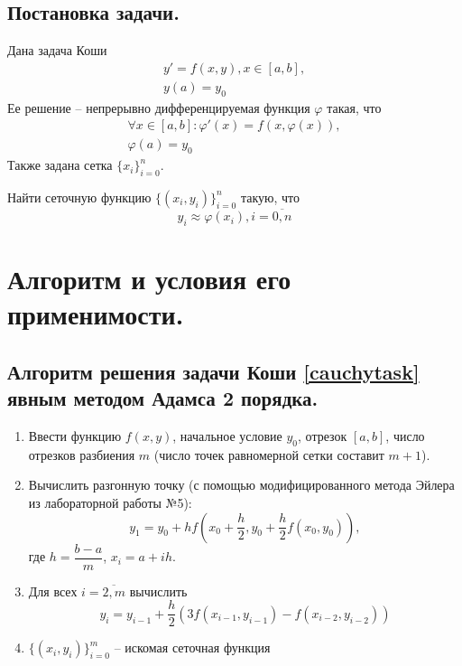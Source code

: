 \documentclass[a4paper, 12pt]{article}
\begin{document}
	\subsection{Постановка задачи.}
	
	Дана задача Коши
	\begin{equation} \label{cauchytask}
		\begin{gathered}
			y'=f(x,y), x\in[a,b],\\
			y(a)=y_0
		\end{gathered}
	\end{equation}
	Ее решение -- непрерывно дифференцируемая функция $\varphi$ такая, что
	\begin{equation}
		\begin{gathered}
			\forall x\in[a,b]: \varphi'(x)=f(x,\varphi(x)),\\ 
			\varphi(a)=y_0
		\end{gathered}
	\end{equation}
	Также задана сетка $\{x_i\}_{i=0}^n$.
	
	Найти сеточную функцию $\{(x_i,y_i)\}_{i=0}^n$ такую, что
	\begin{equation}
		y_i\approx\varphi(x_i), i=\overline{0,n}
	\end{equation}
	
	\section{Алгоритм и условия его применимости.}
	
	\subsection{Алгоритм решения задачи Коши \eqref{cauchytask} явным методом Адамса 2 порядка.}
	\label{alghorithm_simple}
	
	\begin{enumerate}
		\item Ввести функцию $f(x,y)$, начальное условие $y_0$, отрезок $[a,b]$, число отрезков разбиения $m$ (число точек равномерной сетки составит $m+1$).
		\item Вычислить разгонную точку (с помощью модифицированного метода Эйлера из лабораторной работы №5):
		\begin{equation} \label{euler}
			y_1 = y_0 + hf(x_0 + \frac{h}{2}, y_0+\frac{h}{2}f(x_0,y_0)),
		\end{equation}
		где $h=\dfrac{b-a}{m}$, $x_i=a+ih$.
		\item Для всех $i=\overline{2,m}$ вычислить
		\begin{equation} \label{method}
			y_i = y_{i-1} + \frac{h}{2}(3f(x_{i-1},y_{i-1})-f(x_{i-2}, y_{i-2}))
		\end{equation}
		\item $\{(x_i,y_i)\}_{i=0}^m$ -- искомая сеточная функция
	\end{enumerate}
	
\end{document}
